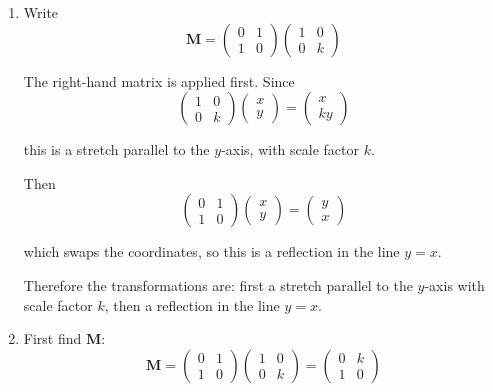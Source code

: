 \documentclass[leqno]{article}
\begin{document}
\begin{enumerate}[
  label=\textbf{\arabic*.},
  leftmargin=*,
  topsep=0pt,
  partopsep=0pt,
  parsep=0pt
]
\vspace*{10pt}

\begin{djsSolution}
\begin{enumerate}[label=\textbf{(\alph*)}]
  \item Write
  \[
  \mathbf{M}
  =
  \begin{pmatrix}
  0 & 1\\
  1 & 0
  \end{pmatrix}
  \begin{pmatrix}
  1 & 0\\
  0 & k
  \end{pmatrix}
  \]
  
  The right-hand matrix is applied first. Since
  \[
  \begin{pmatrix}
  1 & 0\\
  0 & k
  \end{pmatrix}
  \begin{pmatrix}
  x\\y
  \end{pmatrix}
  =
  \begin{pmatrix}
  x\\ky
  \end{pmatrix}
  \]

  this is a stretch parallel to the $y$-axis, with scale factor $k$.

  Then
  \[
  \begin{pmatrix}
  0 & 1\\
  1 & 0
  \end{pmatrix}
  \begin{pmatrix}
  x\\y
  \end{pmatrix}
  =
  \begin{pmatrix}
  y\\x
  \end{pmatrix}
  \]

  which swaps the coordinates, so this is a reflection in the line $y=x$.

  Therefore the transformations are: first a stretch parallel to the $y$-axis with scale factor $k$, then a reflection in the line $y=x$.

  \item First find $\mathbf{M}$:
  \[
  \mathbf{M}
  =
  \begin{pmatrix}
  0 & 1\\
  1 & 0
  \end{pmatrix}
  \begin{pmatrix}
  1 & 0\\
  0 & k
  \end{pmatrix}
  =
  \begin{pmatrix}
  0 & k\\
  1 & 0
  \end{pmatrix}
  \]


\end{enumerate}
\end{djsSolution}
\end{enumerate}
\end{document}
